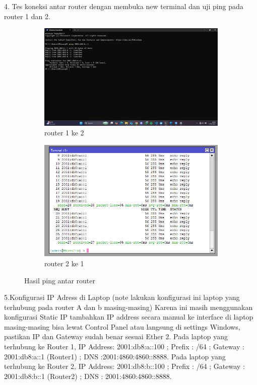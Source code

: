 4. Tes koneksi antar router dengan membuka new terminal dan uji ping pada router 1 dan 2. 
\begin{figure}[H]
    \centering
    \begin{subfigure}[b]{0.3\linewidth}
      \centering
      \includegraphics[width=\linewidth]{image/statis6.jpg}
      \caption{router 1 ke 2}
    \end{subfigure}
    \hspace{1cm}
    \begin{subfigure}[b]{0.3\linewidth}
      \centering
      \includegraphics[width=\linewidth]{image/statis5.png}
      \caption{router 2 ke 1}
    \end{subfigure}
    \caption{Hasil ping antar router}
\end{figure}
5.Konfigurasi IP Adress di Laptop (note lakukan konfigurasi ini laptop yang terhubung pada router A dan b masing-masing) Karena ini masih menggunakan konfigurasi Static IP tambahkan IP address secara manual ke interface di laptop masing-masing bisa lewat Control Panel atau langsung di settings Windows, pastikan IP dan Gateway sudah benar sesuai Ether 2. Pada laptop yang terhubung ke Router 1, IP Address: 2001:db8:a::100 ; Prefix : /64 ; Gateway : 2001:db8:a::1 (Router1) ; DNS :2001:4860:4860::8888. Pada laptop yang terhubung ke Router 2, IP Address: 2001:db8:b::100 ; Prefix : /64 ; Gateway : 2001:db8:b::1 (Router2) ; DNS : 2001:4860:4860::8888.
